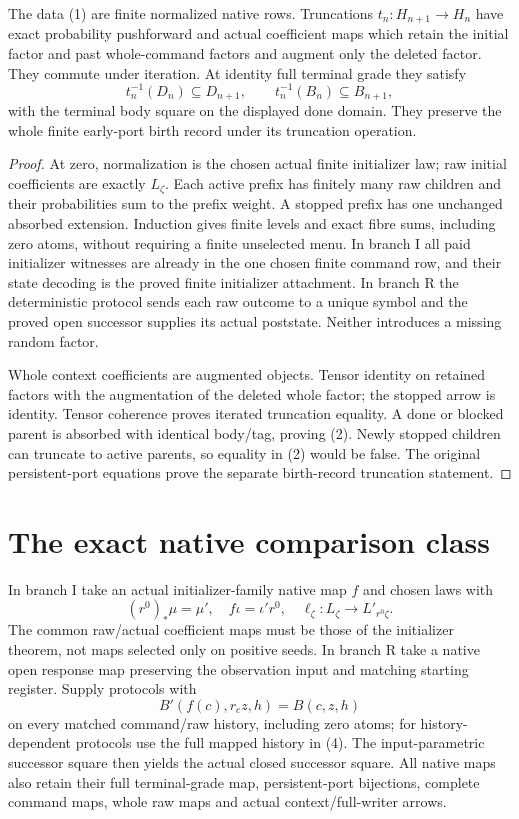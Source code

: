 \documentclass[11pt]{article}
\begin{document}
\begin{theorem}
The data (1) are finite normalized native rows. Truncations $t_n:H_{n+1}\to H_n$ have exact probability pushforward and actual coefficient maps which retain the initial factor and past whole-command factors and augment only the deleted factor. They commute under iteration. At identity full terminal grade they satisfy
\[
                  t_n^{-1}(D_n)\subseteq D_{n+1},\qquad
                  t_n^{-1}(B_n)\subseteq B_{n+1},        \tag{2}
\]
with the terminal body square on the displayed done domain. They preserve the whole finite early-port birth record under its truncation operation.
\end{theorem}
\begin{proof}
At zero, normalization is the chosen actual finite initializer law; raw initial coefficients are exactly $L_\zeta$. Each active prefix has finitely many raw children and their probabilities sum to the prefix weight. A stopped prefix has one unchanged absorbed extension. Induction gives finite levels and exact fibre sums, including zero atoms, without requiring a finite unselected menu. In branch I all paid initializer witnesses are already in the one chosen finite command row, and their state decoding is the proved finite initializer attachment. In branch R the deterministic protocol sends each raw outcome to a unique symbol and the proved open successor supplies its actual poststate. Neither introduces a missing random factor.

Whole context coefficients are augmented objects. Tensor identity on retained factors with the augmentation of the deleted whole factor; the stopped arrow is identity. Tensor coherence proves iterated truncation equality. A done or blocked parent is absorbed with identical body/tag, proving (2). Newly stopped children can truncate to active parents, so equality in (2) would be false. The original persistent-port equations prove the separate birth-record truncation statement.\end{proof}

\section{The exact native comparison class}
In branch I take an actual initializer-family native map $f$ and chosen laws with
\[
 (r^0)_*\mu=\mu',\quad f\iota=\iota'r^0,
 \quad \ell_\zeta:L_\zeta\to L'_{r^0\zeta}.           \tag{3}
\]
The common raw/actual coefficient maps must be those of the initializer theorem, not maps selected only on positive seeds. In branch R take a native open response map preserving the observation input and matching starting register. Supply protocols with
\[
            B'(f(c),r_cz,h)=B(c,z,h)                   \tag{4}
\]
on every matched command/raw history, including zero atoms; for history-dependent protocols use the full mapped history in (4). The input-parametric successor square then yields the actual closed successor square. All native maps also retain their full terminal-grade map, persistent-port bijections, complete command maps, whole raw maps and actual context/full-writer arrows.
\end{document}
